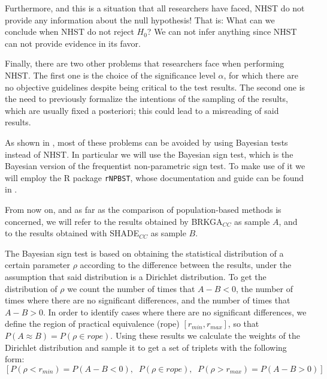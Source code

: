 \documentclass[review]{elsarticle}
\begin{document}
Furthermore, and this is a situation that all researchers have faced, NHST do not provide any information about the null hypothesis! That is: What can we conclude when NHST do not reject $H_0$? We can not infer anything since NHST can not provide evidence in its favor.

Finally, there are two other problems that researchers face when performing NHST. The first one is the choice of the significance level $\alpha$, for which there are no objective guidelines despite being critical to the test results. The second one is the need to previously formalize the intentions of the sampling of the results, which are usually fixed a posteriori; this could lead to a misreading of said results.

As shown in \cite{benavoli2017time}, most of these problems can be avoided by using Bayesian tests instead of NHST. In particular we will use the Bayesian sign test, which is the Bayesian version of the frequentist non-parametric sign test. To make use of it we will employ the R package \texttt{rNPBST}, whose documentation and guide can be found in \cite{carrasco2017rnpbst}.

From now on, and as far as the comparison of population-based methods is concerned, we will refer to the results obtained by BRKGA$_{CC}$ as sample $A$, and to the results obtained with SHADE$_{CC}$ as sample $B$.

The Bayesian sign test is based on obtaining the statistical distribution of a certain parameter $\rho$ according to the difference between the results, under the assumption that said distribution is a Dirichlet distribution. To get the distribution of $\rho$ we count the number of times that $A - B < 0$, the number of times where there are no significant differences, and the number of times that $A - B > 0$. In order to identify cases where there are no significant differences, we define the region of practical equivalence (rope) $[r_{min}, r_{max}]$, so that $P(A \approx B) = P(\rho \in rope)$. Using these results we calculate the weights of the Dirichlet distribution and sample it to get a set of triplets with the following form: 
$$[P(\rho < r_{min}) = P(A - B < 0),\;\; P(\rho \in rope),\;\; P(\rho > r_{max}) = P(A - B > 0)]$$
\end{document}
